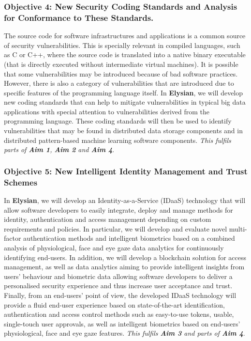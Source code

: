 \documentclass[a4paper,11pt]{article}
\newcommand{\project}[1]{\textbf{#1}\xspace}
\newcommand{\SECURITY}{\project{Elysian}}
\newcommand{\TheProject}{\SECURITY}
\begin{document}
\subsubsection*{Objective 4: New Security Coding Standards and Analysis for Conformance to These Standards.}
The source code for software infrastructures and applications is a common source of security vulnerabilities. This is specially relevant in compiled languages, such as C or C++, where the source code is translated into a native binary executable (that is directly executed without intermediate virtual machines). It is possible that some vulnerabilities may be introduced because of bad software practices. However, there is also a category of vulnerabilities that are introduced due to specific features of the programming language itself.
In \TheProject{}, we will develop new coding standards that can help to mitigate vulnerabilities in typical big data applications with special attention to vulnerabilities derived from  the programming language. %
These coding standards will then be used to identify vulnerabilities that may be found in distributed data storage components and in distributed pattern-based machine learning software components. \emph{This fulfils parts of \textbf{Aim 1}, \textbf{Aim 2} and \textbf{Aim 4}}.

\subsubsection*{Objective 5: New Intelligent Identity Management and Trust Schemes}
\vspace{-6pt}

In \TheProject{}, we will develop an Identity-as-a-Service (IDaaS) technology that will allow software developers to easily integrate, deploy and manage methods for identity, authentication and access management depending on custom requirements and policies. In particular, we will develop and evaluate novel multi-factor authentication methods and intelligent biometrics based on a combined analysis of physiological, face and eye gaze data analytics for continuously identifying end-users. In addition, we will develop a blockchain solution for access management, as well as data analytics aiming to provide intelligent insights from users' behaviour and biometric data allowing software developers to deliver a personalised security experience and thus increase user acceptance and trust. Finally, from an end-users' point of view, the developed IDaaS technology will provide a fluid end-user experience based on state-of-the-art identification, authentication and access control methods such as easy-to-use tokens, usable, single-touch user approvals, as well as intelligent biometrics based on end-users' physiological, face and eye gaze features. \emph{This fulfils \textbf{Aim 3} and parts of \textbf{Aim 4}}.
\end{document}
